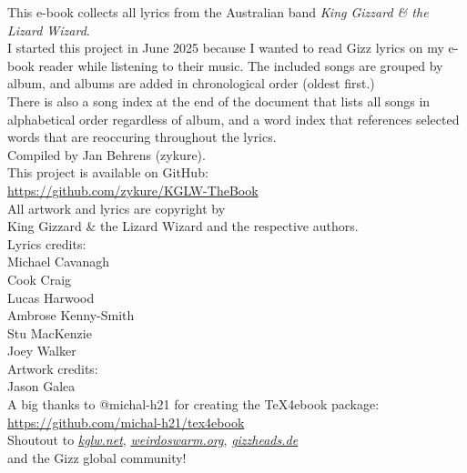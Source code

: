 \begin{center}
\vspace*{\fill}

This e-book collects all lyrics from the Australian band \emph{King Gizzard \& the Lizard Wizard}. \\
I started this project in June 2025 because I wanted to read Gizz lyrics on my e-book reader while listening to their music.
The included songs are grouped by album, and albums are added in chronological order (oldest first.) \\
There is also a song index at the end of the document that lists all songs in alphabetical order regardless of album,
and a word index that references selected words that are reoccuring throughout the lyrics. \\[5mm]

Compiled by Jan Behrens (zykure). \\[5mm]

This project is available on GitHub: \\
\href{https://github.com/zykure/KGLW-TheBook}{https://github.com/zykure/KGLW-TheBook} \\[15mm]

All artwork and lyrics are copyright by \\
King Gizzard \& the Lizard Wizard and the respective authors. \\[10mm]

Lyrics credits: \\
Michael Cavanagh \\
Cook Craig \\
Lucas Harwood \\
Ambrose Kenny-Smith \\
Stu MacKenzie \\
Joey Walker \\[10mm]

Artwork credits: \\
Jason Galea \\[15mm]

A big thanks to @michal-h21 for creating the TeX4ebook package: \\
\href{https://github.com/michal-h21/tex4ebook}{https://github.com/michal-h21/tex4ebook}  \\[5mm]

Shoutout to \href{https://kglw.net}{\textit{kglw.net}}, \href{https://weirdoswarm.org}{\textit{weirdoswarm.org}}, \href{https://gizzheads.de}{\textit{gizzheads.de}} \\
and the Gizz global community!  \\

\vfill
\end{center}
